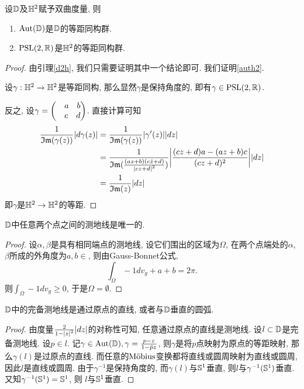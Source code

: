 \begin{theorem}
    设$\D$及$\HH$赋予双曲度量, 则
    \begin{enumerate}
        \item $\aut(\D)$是$\D$的等距同构群. 
        \item $\psl(2,\R)$是$\HH$的等距同构群.\label{auth2}
    \end{enumerate}
\end{theorem}
\begin{proof}
    由引理\eqref{d2h}, 我们只需要证明其中一个结论即可. 我们证明\eqref{auth2}. 
    \par 设$\gamma: \HH \to \HH$是等距同构, 那么显然$\gamma$是保持角度的, 即有$\gamma \in \psl(2,\R)$.
    \par 反之, 设$\gamma=\begin{pmatrix}
        &a \s b\\
        &c \s d
    \end{pmatrix}$.  直接计算可知
    \begin{equation}
        \begin{split}
            \rec{\Im(\gamma(z))}\abs{d\gamma(z)}&=\rec{\Im(\gamma(z))}\abs{\gamma'(z)}\abs{dz} \\
            &=\rec{\Im(\frac{(az+b)(c\bar{z}+d)}{\abs{cz+d}^2})} \abs{\frac{(cz+d)a-(az+b)c}{(cz+d)^2}} \abs{dz} \\
            &=\rec{\Im(z)}\abs{dz}
        \end{split}
    \end{equation}
    即$\gamma$是$\HH \to \HH$的等距.
\end{proof}
\begin{lemma}
    $\D$中任意两个点之间的测地线是唯一的.
\end{lemma}
\begin{proof}
    设$\alpha,\beta$是具有相同端点的测地线, 设它们围出的区域为$\Omega$, 在两个点端处的$\alpha$,$\beta$所成的外角度为$a,b \in $, 则由Gauss-Bonnet公式,
    \begin{equation}
        \int_\Omega -1dv_g+a+b=2\pi.
    \end{equation}
    则$\int_\Omega -1dv_g \ge 0$, 于是$\Omega =\emptyset$.
\end{proof}
\begin{theorem}
    $\D$中的完备测地线是通过原点的直线, 或者与$\D$垂直的圆弧.
\end{theorem}
\begin{proof}
    由度量$\frac{2}{1-\abs{z}^2}\abs{dz}$的对称性可知, 任意通过原点的直线是测地线. 设$l \subset \D$是完备测地线. 设$p\in l$. 记$\gamma\in \aut(\D), \gamma=\frac{p-z}{1-\bar{p}z}$, 则$\gamma$是将$p$点映射为原点的等距映射, 那么$\gamma(l)$是过原点的直线. 而任意的$\mobius$变换都将直线或圆周映射为直线或圆周, 因此$l$是直线或圆周. 由于$\gamma^{-1}$是保持角度的, 而$\gamma(l)$与$\S^1$垂直, 则$l$与$\gamma^{-1}(\S^1)$垂直. 又知$\gamma^{-1}(\S^1)=\S^1$, 则 $l$与$\S^1$垂直.
\end{proof}
